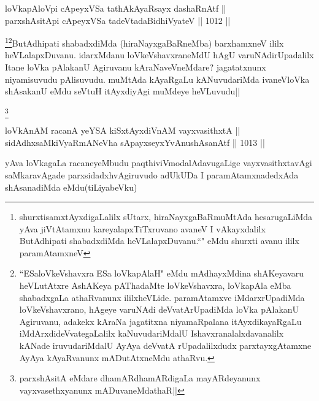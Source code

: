 \begin{shl}
loVkapAloV\s pi cApeyxVSa tathAkAyaRsayx dashaRnAtf || \\
parxshAsitA\s pi cApeyxVSa tadeVtadaBidhiVyateV ||  1012 ||  
\end{shl}

\begin{artha}
\footnote{shurxtisamxtAyxdigaLalilx sUtarx, hiraNayxgaBaRmuMtAda hesarugaLiMda yAva jiVtAtamxnu kareyalapxTiTxruvano avaneV I vAkayxdalilx ButAdhipati shabadxdiMda heVLalapxDuvanu.``\stext" eMdu shurxti avanu ililx paramAtamxneV}\footnote{``ESaloVkeVshavxra ESa loVkapAlaH" eMdu mAdhayxMdina shAKeyavaru heVLutAtxre AshAKeya pAThadaMte loVkeVshavxra, loVkapAla eMba shabadxgaLa athaRvanunx ililxheVLide. paramAtamxve iMdarxrUpadiMda loVkeVshavxrano, hAgeye varuNAdi deVvatArUpadiMda loVka pAlakanU Agiruvanu, adakekx kAraNa jagatitxna niyamaRpalana itAyxdikayaRgaLu iMdArxdideVvategaLalilx kaNuvudariMdalU Ishavxranalalxdavanalilx kANade iruvudariMdalU AyAya deVvatA rUpadalilxdudx parxtayxgAtamxne AyAya kAyaRvanunx mADutAtxneMdu athaRvu.}ButAdhipati shabadxdiMda (hiraNayxgaBaRneMba) barxhamxneV ililx heVLalapxDuvanu. idarxMdanu loVkeVshavxraneMdU hAgU varuNAdirUpadalilx Itane loVka pAlakanU Agiruvanu kAraNaveVneMdare? jagatatxnunx niyamisuvudu pAlisuvudu. muMtAda kAyaRgaLu kANuvudariMda ivaneVloVka shAsakanU eMdu seVtuH itAyxdiyAgi muMdeye heVLuvudu||
\end{artha}

\begin{artha}
\footnote{parxshAsitA eMdare dhamARdhamARdigaLa mayARdeyanunx vayxvasethxyanunx mADuvaneMdathaR||}
\end{artha}


\begin{shl}
loVkAnAM racanA yeYSA kiSxtAyxdiVnAM vayxvasithxtA || \\
sidAdhx\s saMkiVyaRmANeVha sA\s payxseyxYvAnushAsanAtf ||  1013 ||  
\end{shl}

\begin{artha}
yAva loVkagaLa racaneyeMbudu paqthiviVmodalAdavugaLige vayxvasithxtavAgi saMkaravAgade parxsidadxhvAgiruvudo adUkUDa I paramAtamxnadedxAda shAsanadiMda eMdu(tiLiyabeVku)
\end{artha}


